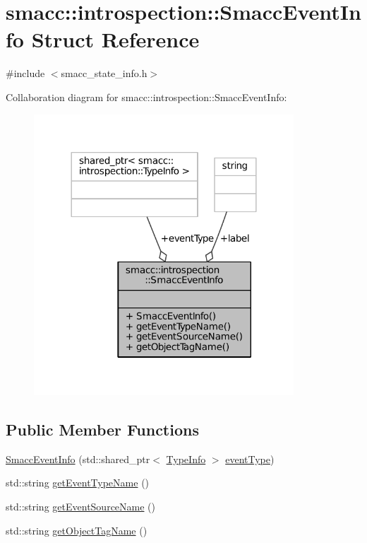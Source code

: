 \hypertarget{structsmacc_1_1introspection_1_1SmaccEventInfo}{}\section{smacc\+:\+:introspection\+:\+:Smacc\+Event\+Info Struct Reference}
\label{structsmacc_1_1introspection_1_1SmaccEventInfo}


{\ttfamily \#include $<$smacc\+\_\+state\+\_\+info.\+h$>$}



Collaboration diagram for smacc\+:\+:introspection\+:\+:Smacc\+Event\+Info\+:
\nopagebreak
\begin{figure}[H]
\begin{center}
\leavevmode
\includegraphics[width=276pt]{structsmacc_1_1introspection_1_1SmaccEventInfo__coll__graph}
\end{center}
\end{figure}
\subsection*{Public Member Functions}
\begin{DoxyCompactItemize}
\item 
\hyperlink{structsmacc_1_1introspection_1_1SmaccEventInfo_a322035851e387c9cb58bc1cfe4c68544}{Smacc\+Event\+Info} (std\+::shared\+\_\+ptr$<$ \hyperlink{classsmacc_1_1introspection_1_1TypeInfo}{Type\+Info} $>$ \hyperlink{structsmacc_1_1introspection_1_1SmaccEventInfo_af3bdf1abf797864e681662d92a5515f9}{event\+Type})
\item 
std\+::string \hyperlink{structsmacc_1_1introspection_1_1SmaccEventInfo_ae0ed6a9506dbe526269a0bd956a71044}{get\+Event\+Type\+Name} ()
\item 
std\+::string \hyperlink{structsmacc_1_1introspection_1_1SmaccEventInfo_af9e90a557f8f62069a17234f79bcefa0}{get\+Event\+Source\+Name} ()
\item 
std\+::string \hyperlink{structsmacc_1_1introspection_1_1SmaccEventInfo_a0aa5d15822e7642079f375ee0f4ff096}{get\+Object\+Tag\+Name} ()
\end{DoxyCompactItemize}
